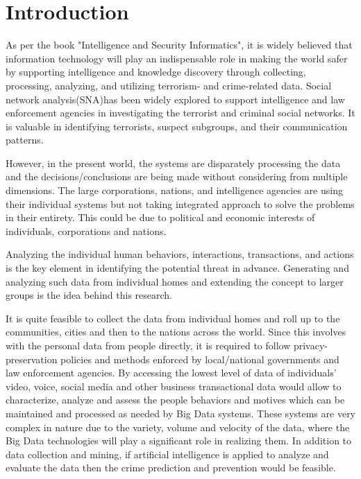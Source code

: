 \documentclass[sigconf]{acmart}
\begin{document}
\section{Introduction}
As per the book "Intelligence and Security Informatics"\cite{Kantor2005}, it is widely believed that information technology will play an indispensable role in making the world safer by supporting intelligence and knowledge discovery through collecting, processing, analyzing, and utilizing terrorism- and crime-related data. Social network analysis(SNA)has been widely explored to support intelligence and law enforcement agencies in investigating the terrorist and criminal social networks. It is valuable in identifying terrorists, suspect subgroups, and their communication patterns.

However, in the present world, the systems are disparately processing the data and the decisions/conclusions are being made without considering from multiple dimensions. The large corporations, nations, and intelligence agencies are using their individual systems but not taking integrated approach to solve the problems in their entirety. This could be due to political and economic interests of individuals, corporations and nations.

Analyzing the individual human behaviors, interactions, transactions, and actions is the key element in identifying the potential threat in advance. Generating and analyzing such data from individual homes and extending the concept to larger groups is the idea behind this research.

It is quite feasible to collect the data from individual homes and roll up to the communities, cities and then to the nations across the world. Since this involves with the personal data from people directly, it is required to follow privacy-preservation policies and methods enforced by local/national governments and law enforcement agencies. By accessing the lowest level of data of individuals’ video, voice, social media and other business transactional data would allow to characterize, analyze and assess the people behaviors and motives which can be maintained and processed as needed by Big Data systems. These systems are very complex in nature due to the variety, volume and velocity of the data, where the Big Data technologies will play a significant role in realizing them. In addition to data collection and mining, if artificial intelligence is applied to analyze and evaluate the data then the crime prediction and prevention would be feasible.
\end{document}
